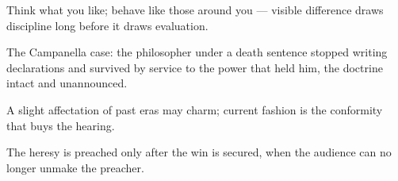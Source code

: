 

\begin{distilled}
  \item Think what you like; behave like those around you --- visible difference draws discipline long before it draws evaluation.
  \item The Campanella case: the philosopher under a death sentence stopped writing declarations and survived by service to the power that held him, the doctrine intact and unannounced.
  \item A slight affectation of past eras may charm; current fashion is the conformity that buys the hearing.
  \item The heresy is preached only after the win is secured, when the audience can no longer unmake the preacher.
\end{distilled}
